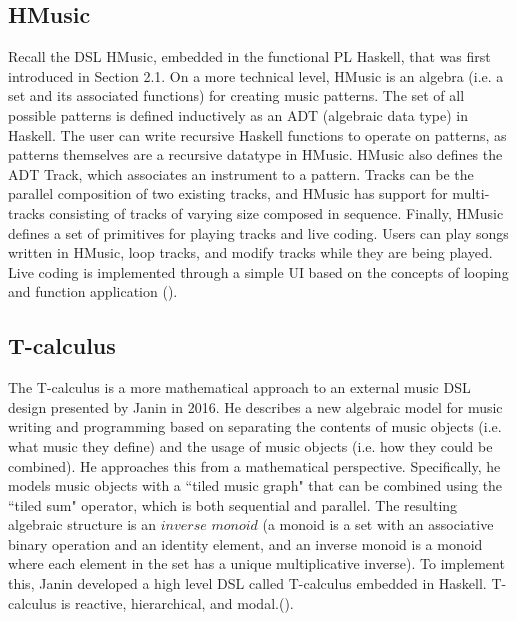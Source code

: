 \documentclass{report}
\newcommand\citeparen[1]{(\cite{#1})}
\begin{document}
\subsection{HMusic}
Recall the DSL HMusic, embedded in the functional PL Haskell, that was first introduced in Section 2.1. On a  more  technical level, HMusic is an algebra (i.e. a set and its associated functions) for creating music  patterns. The set of  all possible patterns is defined  inductively as an ADT (algebraic data  type) in Haskell. The user can write recursive  Haskell functions to operate on patterns, as patterns  themselves are a recursive datatype in HMusic. HMusic also defines the ADT Track, which associates an instrument to a pattern. Tracks can be  the parallel composition of two existing  tracks, and HMusic has support for multi-tracks consisting of tracks of varying size composed in sequence. Finally, HMusic defines a set of primitives for playing  tracks and live coding. Users can play songs  written in HMusic, loop tracks, and  modify tracks while they are being  played. Live coding is implemented through a simple  UI  based  on the concepts of looping and  function application \citeparen{bois_ribeiro_1970}.

\subsection{T-calculus}
The T-calculus is a more mathematical  approach to an external music DSL design presented by Janin in 2016. He describes  a  new  algebraic model for music  writing and  programming based on separating  the contents of music objects (i.e.  what  music  they define)  and the usage of music  objects  (i.e.  how  they could be  combined). He approaches this from a mathematical perspective. Specifically, he  models music objects with a ``tiled music graph" that can be combined using the  ``tiled  sum"  operator, which is both sequential and parallel. The  resulting algebraic structure is  an $inverse$ $monoid$  (a monoid is  a set with an associative binary operation and  an identity element, and an inverse monoid is a monoid where each element  in the set has a unique multiplicative inverse). To  implement this, Janin developed a high  level DSL called T-calculus embedded  in Haskell. T-calculus  is  reactive, hierarchical, and modal.\citeparen{janin}.
\end{document}
